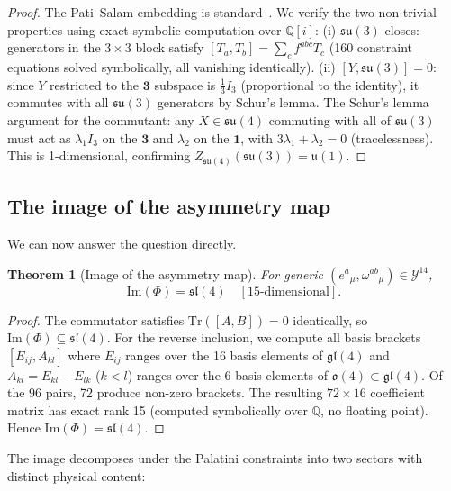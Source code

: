 \documentclass[12pt,a4paper]{article}
\theoremstyle{plain}
\newtheorem{theorem}{Theorem}[section]
\theoremstyle{definition}
\theoremstyle{remark}
\begin{document}
\begin{proof}
The Pati--Salam embedding is standard~\cite{PatiSalam1974}.  We verify the two 
non-trivial properties using exact symbolic computation over $\mathbb{Q}[i]$:
(i) $\mathfrak{su}(3)$ closes: generators in the $3\times 3$ block satisfy 
$[T_a, T_b] = \sum_c f^{abc} T_c$ (160 constraint equations solved symbolically,
all vanishing identically).
(ii) $[Y, \mathfrak{su}(3)] = 0$: since $Y$ restricted to the $\mathbf{3}$ subspace is 
$\tfrac{1}{3}I_3$ (proportional to the identity), it commutes with all $\mathfrak{su}(3)$ 
generators by Schur's lemma.
The Schur's lemma argument for the commutant: any $X \in \mathfrak{su}(4)$ commuting 
with all of $\mathfrak{su}(3)$ must act as $\lambda_1 I_3$ on the $\mathbf{3}$ and 
$\lambda_2$ on the $\mathbf{1}$, with $3\lambda_1 + \lambda_2 = 0$ (tracelessness).  
This is 1-dimensional, confirming $Z_{\mathfrak{su}(4)}(\mathfrak{su}(3)) = \mathfrak{u}(1)$.
\end{proof}

\subsection{The image of the asymmetry map}

We can now answer the question directly.

\begin{theorem}[Image of the asymmetry map]\label{thm:image-phi}
For generic $(e^a{}_\mu, \omega^{ab}{}_\mu) \in \mathcal{Y}^{14}$,
\begin{equation}
  \mathrm{Im}(\Phi) = \mathfrak{sl}(4) \quad [\text{15-dimensional}].
\end{equation}
\end{theorem}

\begin{proof}
The commutator satisfies $\mathrm{Tr}([A,B]) = 0$ identically, so 
$\mathrm{Im}(\Phi) \subseteq \mathfrak{sl}(4)$.
For the reverse inclusion, we compute all basis brackets $[E_{ij}, A_{kl}]$ where $E_{ij}$ ranges over the 16
basis elements of $\mathfrak{gl}(4)$ and $A_{kl}=E_{kl}-E_{lk}$ ($k<l$) ranges over the 6 basis
elements of $\mathfrak{o}(4)\subset\mathfrak{gl}(4)$. Of the 96 pairs, 72 produce non-zero brackets.
The resulting $72\times 16$ coefficient matrix has exact rank 15 (computed symbolically over $\mathbb{Q}$, no floating point).
Hence $\mathrm{Im}(\Phi) = \mathfrak{sl}(4)$.
\end{proof}

The image decomposes under the Palatini constraints into two sectors with distinct physical content:
\end{document}
